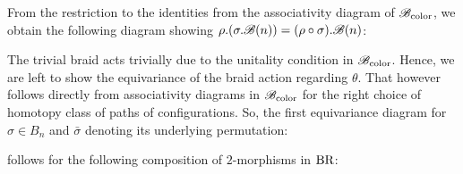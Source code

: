 \begin{eg}
    
    From the restriction to the identities from the associativity diagram of
    $\mathscr{B}_{\text{color}}$, we obtain the following diagram showing $\rho.(\sigma.\mathscr{B}(n))=(\rho
    \circ \sigma).\mathscr{B}(n)$:
    \begin{center}
    \end{center}
    The trivial braid acts trivially due to the unitality condition in $\mathscr{B}_{\text{color}}$.
    Hence, we are left to show the equivariance of the braid action regarding
    $\theta$. That however follows directly from associativity diagrams in $\mathscr{B}_{\text{color}}$
    for the right choice of homotopy class of paths of configurations. So, the
    first equivariance diagram for $\sigma \in B_n$ and $\bar{\sigma}$ denoting
    its underlying permutation:
    \begin{center}
    \end{center}      
    follows for the following composition of $2$-morphisms in $\operatorname{BR}$:
    \begin{center}
\end{center}
\end{eg}
